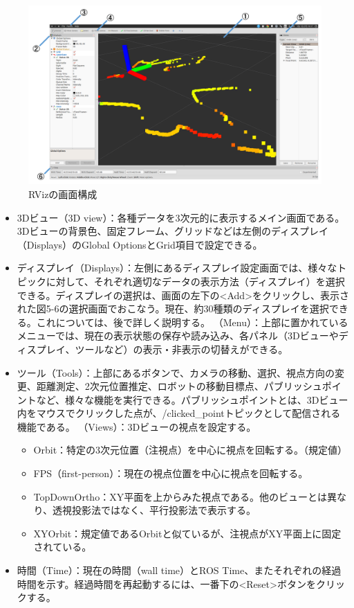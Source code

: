 \begin{figure}[h]
  \centering
  \includegraphics[width=15cm]{pictures/chapter5/pic_05_05.png}
  \caption{RVizの画面構成}
\end{figure}

\begin{itemize}
\item 3Dビュー（3D view）：各種データを3次元的に表示するメイン画面である。3Dビューの背景色、固定フレーム、グリッドなどは左側のディスプレイ（Displays）のGlobal OptionsとGrid項目で設定できる。
\item ディスプレイ（Displays）：左側にあるディスプレイ設定画面では、様々なトピックに対して、それぞれ適切なデータの表示方法（ディスプレイ）を選択できる。ディスプレイの選択は、画面の左下の<Add>をクリックし、表示された図5-6の選択画面でおこなう。現在、約30種類のディスプレイを選択できる。これについては、後で詳しく説明する。
（Menu）：上部に置かれているメニューでは、現在の表示状態の保存や読み込み、各パネル（3Dビューやディスプレイ、ツールなど）の表示・非表示の切替えができる。
\item ツール（Tools）：上部にあるボタンで、カメラの移動、選択、視点方向の変更、距離測定、2次元位置推定、ロボットの移動目標点、パブリッシュポイントなど、様々な機能を実行できる。パブリッシュポイントとは、3Dビュー内をマウスでクリックした点が、/clicked\_pointトピックとして配信される機能である。
（Views）：3Dビューの視点を設定する。
  \begin{itemize}
  \item Orbit：特定の3次元位置（注視点）を中心に視点を回転する。（規定値）
  \item FPS（first-person）：現在の視点位置を中心に視点を回転する。
  \item TopDownOrtho：XY平面を上からみた視点である。他のビューとは異なり、透視投影法ではなく、平行投影法で表示する。
  \item  XYOrbit：規定値であるOrbitと似ているが、注視点がXY平面上に固定されている。
  \end{itemize}
\item 時間（Time）：現在の時間（wall time）とROS Time、またそれぞれの経過時間を示す。経過時間を再起動するには、一番下の<Reset>ボタンをクリックする。
\end{itemize}

